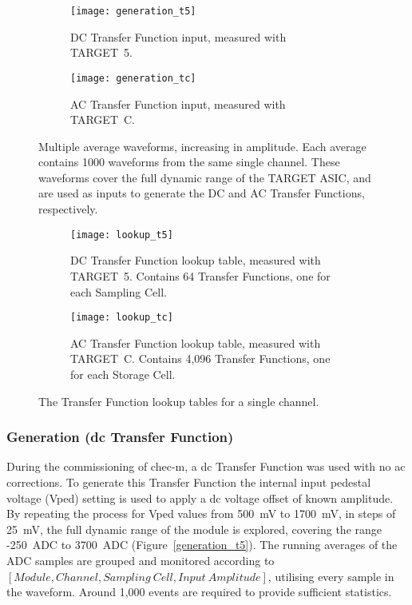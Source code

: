 \begin{figure}
  \begin{subfigure}[b]{0.49\textwidth}
    \texttt{[image: generation\_t5]}
    \caption{DC Transfer Function input, measured with TARGET~5.}
    \label{fig:generation_t5}
  \end{subfigure}
  \hfill
  \begin{subfigure}[b]{0.49\textwidth}
    \texttt{[image: generation\_tc]}
    \caption{AC Transfer Function input, measured with TARGET~C.}
    \label{fig:generation_tc}
  \end{subfigure}
  \caption[Transfer Function generation waveforms.]{Multiple average waveforms, increasing in amplitude. Each average contains 1000 waveforms from the same single channel. These waveforms cover the full dynamic range of the TARGET ASIC, and are used as inputs to generate the DC and AC Transfer Functions, respectively.}
\end{figure}

\begin{figure}
  \begin{subfigure}[b]{0.49\textwidth}
    \texttt{[image: lookup\_t5]}
    \caption{DC Transfer Function lookup table, measured with TARGET~5. Contains 64 Transfer Functions, one for each Sampling Cell.}
    \label{fig:lookup_t5}
  \end{subfigure}
  \hfill
  \begin{subfigure}[b]{0.49\textwidth}
    \texttt{[image: lookup\_tc]}
    \caption{AC Transfer Function lookup table, measured with TARGET~C. Contains 4,096 Transfer Functions, one for each Storage Cell.}
    \label{fig:lookup_tc}
  \end{subfigure}
  \caption[Transfer Function lookup tables.]{The Transfer Function lookup tables for a single channel.}
\end{figure}

\subsubsection{Generation (\gls{dc} Transfer Function)}

During the commissioning of \gls{chec-m}, a \gls{dc} Transfer Function was used with no \gls{ac} corrections. To generate this Transfer Function the internal input pedestal voltage (Vped) setting is used to apply a \gls{dc} voltage offset of known amplitude. By repeating the process for Vped values from 500~mV to 1700~mV, in steps of 25~mV, the full dynamic range of the module is explored, covering the range -250~ADC to 3700~ADC (Figure~\ref{generation_t5}). The running averages of the ADC samples are grouped and monitored according to $[Module, Channel, Sampling~Cell, Input~Amplitude]$, utilising every sample in the waveform. Around 1,000 events are required to provide sufficient statistics.

